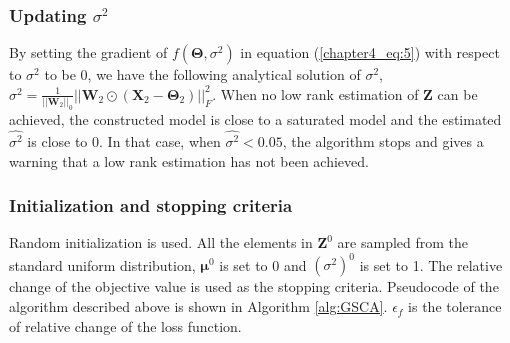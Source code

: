 \subsubsection*{Updating $\sigma^2$}
By setting the gradient of $f(\mathbf{\Theta},\sigma^2)$ in equation (\ref{chapter4_eq:5}) with respect to $\sigma^2$ to be 0, we have the following analytical solution of $\sigma^2$,  $\sigma^2= \frac{1}{||\mathbf{W}_2||_0} ||\mathbf{W}_2 \odot (\mathbf{X}_2 - \mathbf{\Theta}_2)||_F^2$. When no low rank estimation of $\mathbf{Z}$ can be achieved, the constructed model is close to a saturated model and the estimated $\hat{\sigma^2}$ is close to 0. In that case, when $\hat{\sigma^2}<0.05$, the algorithm stops and gives a warning that a low rank estimation has not been achieved.

\subsubsection*{Initialization and stopping criteria}
Random initialization is used. All the elements in $\mathbf{Z}^0$ are sampled from the standard uniform distribution, $\bm{\mu}^0$ is set to 0 and $(\sigma^2)^0$ is set to 1. The relative change of the objective value is used as the stopping criteria. Pseudocode of the algorithm described above is shown in Algorithm \ref{alg:GSCA}. $\epsilon_f$ is the tolerance of relative change of the loss function.

